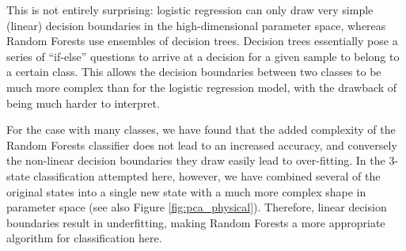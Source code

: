 \documentclass[12pt]{emulateapj}
\begin{document}
This is not entirely surprising: logistic regression can only draw very simple (linear) decision boundaries in the high-dimensional parameter space, whereas Random Forests use ensembles of decision trees. Decision trees essentially pose a series of ``if-else'' questions to arrive at a decision for a given sample to belong to a certain class. This allows the decision boundaries between two classes to be much more complex than for the logistic regression model, with the drawback of being much harder to interpret.

 For the case with many classes, we have found that the added complexity of the Random Forests classifier does not lead to an increased accuracy, and conversely the non-linear decision boundaries they draw easily lead to over-fitting. In the 3-state classification attempted here, however, we have combined several of the original states into a single new state with a much more complex shape in parameter space (see also Figure \ref{fig:pca_physical}). Therefore, linear decision boundaries result in underfitting, making Random Forests a more appropriate algorithm for classification here. 
\end{document}

